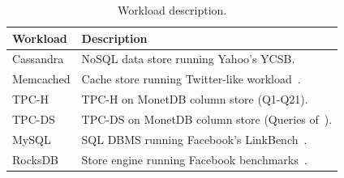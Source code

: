 \begin{table}
 \begin{center}
  \caption{Workload description.}
  \scalebox{0.7}
  \small
  \vspace{0.01in}
  \label{table:workload}
  \renewcommand{\arraystretch}{1.0}
   {\scriptsize
    \begin{tabular}{ l  l }
     \toprule
      {\bf Workload}                  & {\bf Description}  \\
     	\toprule
      	\multirow{1}{*}{Cassandra}                       &  NoSQL data store running Yahoo's YCSB. \\
     	\cmidrule{2-2}
      	\multirow{1}{*}{Memcached}                      & Cache store running Twitter-like workload~\cite{lim:thin}. \\
	\cmidrule{2-2}
		\multirow{1}{*}{TPC-H}	& TPC-H on MonetDB column store (Q1-Q21). \\
	\cmidrule{2-2}
		\multirow{1}{*}{TPC-DS}	& TPC-DS on MonetDB column store (Queries of~\cite{kocberber:meet}). \\
		\cmidrule{2-2}
	 	\multirow{1}{*}{MySQL} 			& SQL DBMS running Facebook's LinkBench~\cite{facebook:linkbench}. \\
     \cmidrule{2-2}
      \multirow{1}{*}{RocksDB}                             &  Store engine running Facebook benchmarks~\cite{facebook:rocksdb}. \\ %

     \bottomrule
    \end{tabular}
   } %
 \end{center}
  \vspace{-0.1in}
\end{table}


